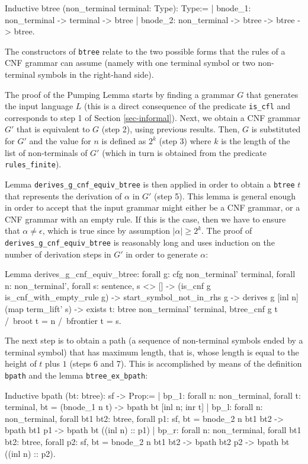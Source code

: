 \documentclass {elsarticle}
\begin{document}
\begin{coq}
Inductive btree (non_terminal terminal: Type): Type:=
| bnode_1: non_terminal -> terminal -> btree
| bnode_2: non_terminal -> btree -> btree -> btree.
\end{coq}

The constructors of \texttt {btree} relate to the two possible forms that the rules of a CNF grammar can assume (namely with one terminal symbol or two non-terminal symbols in the right-hand side).

The proof of the Pumping Lemma starts by finding a grammar $G$ that generates the input language $L$ (this is a direct consequence of the predicate \texttt {is\_cfl} and corresponds to step 1 of Section \ref {sec-informal}). Next, we obtain a CNF grammar $G'$ that is equivalent to $G$ (step 2), using previous results. Then, $G$ is substituted for $G'$ and the value for $n$ is defined as $2^k$ (step 3) where $k$ is the length of the list of non-terminals of $G'$ (which in turn is obtained from the predicate \texttt {rules\_finite}).

Lemma \texttt {derives\_g\_cnf\_equiv\_btree} is then applied in order to obtain a \texttt {btree} $t$ that represents the derivation of $\alpha$ in $G'$ (step 5). This lemma is general enough in order to accept that the input grammar might either be a CNF grammar, or a CNF grammar with an empty rule. If this is the case, then we have to ensure that $\alpha \neq \epsilon$, which is true since by assumption $|\alpha| \ge 2^k$. The proof of \texttt {derives\_g\_cnf\_equiv\_btree} is reasonably long and uses induction on the number of derivation steps in $G'$ in order to generate $\alpha$:

\begin{coq}
Lemma derives_g_cnf_equiv_btree:
forall g: cfg non_terminal' terminal,
forall n: non_terminal',
forall s: sentence,
s <> [] ->
(is_cnf g \/ is_cnf_with_empty_rule g) ->
start_symbol_not_in_rhs g ->
derives g [inl n] (map term_lift' s) ->
exists t: btree non_terminal' terminal,
btree_cnf g t /\
broot t = n /\
bfrontier t = s.
\end{coq}

The next step is to obtain a path (a sequence of non-terminal symbols ended by a terminal symbol) that has maximum length, that is, whose length is equal to the height of $t$ plus $1$ (steps 6 and 7). This is accomplished by means of the definition \texttt {bpath} and the lemma \texttt {btree\_ex\_bpath}:

\begin{coq}
Inductive bpath (bt: btree): sf -> Prop:=
| bp_1: forall n: non_terminal,
        forall t: terminal,
        bt = (bnode_1 n t) -> bpath bt [inl n; inr t]
| bp_l: forall n: non_terminal,
        forall bt1 bt2: btree,
        forall p1: sf,
        bt = bnode_2 n bt1 bt2 -> bpath bt1 p1 -> bpath bt ((inl n) :: p1)
| bp_r: forall n: non_terminal,
        forall bt1 bt2: btree,
        forall p2: sf,
        bt = bnode_2 n bt1 bt2 -> bpath bt2 p2 -> bpath bt ((inl n) :: p2).
\end{coq}
\end{document}
